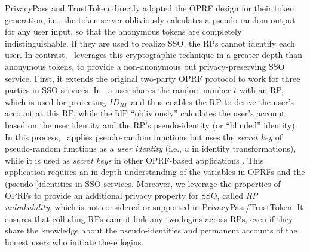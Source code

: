 PrivacyPass and TrustToken directly adopted the OPRF design for their token generation, i.e., the token server obliviously calculates a pseudo-random output for any user input,
so that the anonymous tokens are completely indistinguishable.
If they are used to realize SSO, the RPs cannot identify each user.
In contrast, \usso\ leverages this cryptographic technique in a greater depth than anonymous tokens,
 to provide a non-anonymous but privacy-preserving SSO service. First, it extends the original two-party OPRF protocol to work for three parties in SSO services.
In \usso\ a user shares the random number $t$ with an RP, which is used for protecting $ID_{RP}$ and thus enables the RP to derive the user's account at this RP,
    while the IdP ``obliviously'' calculates the user's account based on the user identity and the RP's pseudo-identity (or ``blinded'' identity).
In this process, \usso\ applies pseudo-random functions but uses the \emph{secret key} of pseudo-random functions as a \emph{user identity} (i.e., $u$ in identity transformations),
    while it is used as \emph{secret keys} in other OPRF-based applications \cite{privacypass,trusttoken,strong-oprf,oprf-bitcoin-wallet,pesto,oprf-ot-si,pp-ss,Private-Contact-Discovery,o-kms,oprf-deduplication}.
This application requires an in-depth understanding of the variables in OPRFs and the (pseudo-)identities in SSO services.
Moreover, we leverage the properties of OPRFs
 to provide an additional privacy property for SSO, called \emph{RP unlinkability}, which is not considered or supported in PrivacyPass/TrustToken.
It ensures that colluding RPs cannot link any two logins across RPs,
  even if they share the knowledge about the pseudo-identities and permanent accounts of the honest users who initiate these logins.



